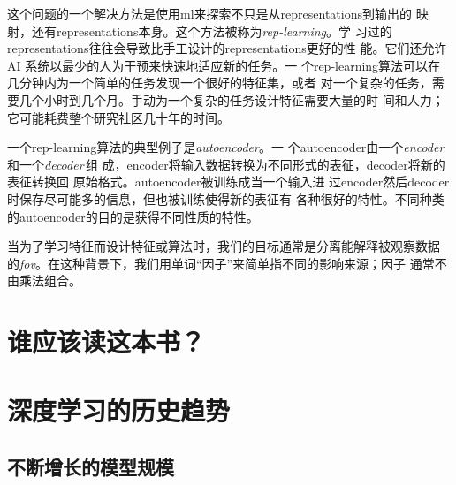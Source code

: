 这个问题的一个解决方法是使用\gls*{ml}来探索不只是从\gls*{representations}到输出的
映射，还有\gls*{representations}本身。这个方法被称为\emph{\gls{rep-learning}}。学
习过的\gls*{representations}往往会导致比手工设计的\gls*{representations}更好的性
能。它们还允许 AI 系统以最少的人为干预来快速地适应新的任务。一
个\gls*{rep-learning}算法可以在几分钟内为一个简单的任务发现一个很好的特征集，或者
对一个复杂的任务，需要几个小时到几个月。手动为一个复杂的任务设计特征需要大量的时
间和人力；它可能耗费整个研究社区几十年的时间。

一个\gls*{rep-learning}算法的典型例子是\emph{\gls{autoencoder}}。一
个\gls*{autoencoder}由一个\emph{\gls{encoder}}\,和一个\emph{\gls{decoder}}\,组
成，\gls*{encoder}将输入数据转换为不同形式的表征，\gls*{decoder}将新的表征转换回
原始格式。\gls*{autoencoder}被训练成当一个输入进
过\gls*{encoder}然后\gls*{decoder}时保存尽可能多的信息，但也被训练使得新的表征有
各种很好的特性。不同种类的\gls*{autoencoder}的目的是获得不同性质的特性。

当为了学习特征而设计特征或算法时，我们的目标通常是分离能解释被观察数据
的\emph{\gls{fov}}。在这种背景下，我们用单词``因子''来简单指不同的影响来源；因子
通常不由乘法组合。

\section{谁应该读这本书？}

\section{深度学习的历史趋势}



\subsection{不断增长的模型规模}
\label{subsec:increasing_model_sizes}
